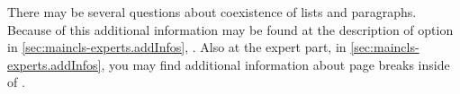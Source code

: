 \begin{Explain}
  There may be several questions about coexistence of lists and
  paragraphs. Because of this additional information may be found at the
  description of option  in
  \autoref{sec:maincls-experts.addInfos},
  . Also at the expert part,
  in \autoref{sec:maincls-experts.addInfos},
   you may find additional
  information about page breaks inside of .%
\end{Explain}%
\fi%
%
%
%
%
\fi %


